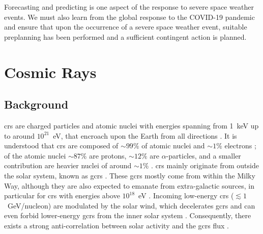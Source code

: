Forecasting and predicting is one aspect of the response to severe space weather events. We must also learn from the global response to the COVID-19 pandemic and ensure that upon the occurrence of a severe space weather event, suitable preplanning has been performed and a sufficient contingent action is planned.





\section{Cosmic Rays}\label{sec:intro_CRs}


\subsection{Background}

\glspl{cr} are charged particles and atomic nuclei with energies spanning from 1~keV up to around $10^{21}$~eV, that encroach upon the Earth from all directions \citep{giacalone_energetic_2010}. It is understood that \glspl{cr} are composed of $\sim99\%$ of atomic nuclei and $\sim1\%$ electrons \citep{gaisser_cosmic_2016}; of the atomic nuclei $\sim87\%$ are protons, $\sim12\%$ are $\alpha$-particles, and a smaller contribution are heavier nuclei of around $\sim1\%$ \citep{grupen_astroparticle_2005, dunai_cosmic_2010, particle_data_group_review_2020}. \glspl{cr} mainly originate from outside the solar system, known as \glspl{gcr} \citep{particle_data_group_review_2020}. These \glspl{gcr} mostly come from within the Milky Way, although they are also expected to emanate from extra-galactic sources, in particular for \glspl{cr} with energies above $10^{18}$~eV \citep{aab_observation_2017}. Incoming low-energy \glspl{cr} ($\lesssim1$~GeV/nucleon) are modulated by the solar wind, which decelerates \glspl{gcr} and can even forbid lower-energy \glspl{gcr} from the inner solar system \citep{grupen_astroparticle_2005}. Consequently, there exists a strong anti-correlation between solar activity and the \glspl{gcr} flux \citep{particle_data_group_review_2020}.

